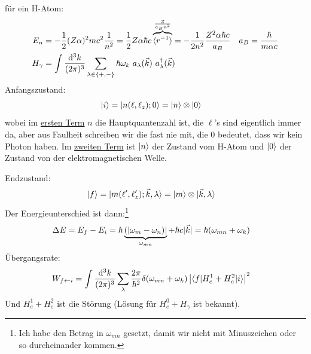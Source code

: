 		für ein H-Atom:
		\begin{align*}
		E_n &= - \frac{1}{2} (Z \alpha)^2 m c^2 \frac{1}{n^2}
		= \frac{1}{2} Z \alpha \hbar c \overbrace{\erw{r^{-1}}}^{\mathclap{\frac{Z}{a_B n^2}}}
		= - \frac{1}{2 n^2} \frac{Z^2 \alpha \hbar c}{a_B} &
		a_B &= \frac{\hbar}{m \alpha c} \\
		H_\gamma &= \int \frac{\diff^3 k}{(2 \pi)^3}
		\sum_{\lambda \in \{+,-\}} \hbar \omega_k
		~a_\lambda (\vec{k})~a^\dagger_\lambda (\vec{k})
		\end{align*}
		Anfangszustand: 
		\begin{align*}
		\ket{i} &= \ket{n(\ell, \ell_z); 0} = \ket{n} \otimes \ket{0}
		\end{align*}
		wobei im \underline{ersten Term} $n$ die Hauptquantenzahl ist, die $\ell$'s sind eigentlich immer da, aber aus Faulheit schreiben wir die fast nie mit, die $0$ bedeutet, dass wir kein Photon haben. Im \underline{zweiten Term} ist $\ket{n}$ der Zustand vom H-Atom und $\ket{0}$ der Zustand von der elektromagnetischen Welle.
		
		Endzustand:
		\begin{align*}
		\ket{f} &= \ket{m(\ell', \ell_z'); \vec{k}, \lambda} 
		= \ket{m} \otimes \ket{\vec{k}, \lambda}
		\end{align*} 
		Der Energieunterschied ist dann:\footnote{Ich habe den Betrag in $\omega_{mn}$ gesetzt, damit wir nicht mit Minuszeichen oder so durcheinander kommen.}
		\begin{align*}
		\Delta E &= E_f - E_i = \hbar 
		\underbrace{(|\omega_m - \omega_n)|}_{\mathclap{\omega_{mn}}} 
		+ \hbar c |\vec{k}| = \hbar (\omega_{mn} + \omega_k)
		\end{align*}
		Übergangsrate: 
		\begin{align*}
		W_{f \leftarrow i} &= 
		\int \frac{\mathrm{d}^3 k}{(2 \pi)^3} \sum_\lambda
		\frac{2 \pi}{\hbar^2} \delta(\omega_{mn} + \omega_k)
		\left|\braket{f | H_e^1 + H_e^2 | i}\right|^2
		\end{align*}	
		Und $H_e^1 + H_e^2$ ist die Störung (Lösung für $H_e^0 + H_\gamma$ ist bekannt).
		
